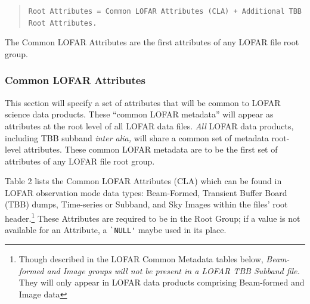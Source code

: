 \documentclass[a4paper,10pt,bibtotoc]{scrartcl}
\begin{document}
\begin{verse}
\verb|Root Attributes = Common LOFAR Attributes (CLA) + Additional TBB Root Attributes.|
\end{verse}

The Common LOFAR Attributes are the first attributes of any LOFAR file root group.

\subsubsection{Common LOFAR Attributes}
This section will specify a set of attributes that will be common to LOFAR science data products.  These ``common LOFAR metadata'' will appear as attributes at the root level of all LOFAR data files.  \textit{All} LOFAR data products, including TBB subband \textit{inter alia,} will share a common set of metadata root-level attributes.  These common LOFAR metadata are to be the first set of attributes of any LOFAR file root group.


Table 2 lists the Common LOFAR Attributes (CLA) which can be found in
LOFAR observation mode data types: Beam-Formed, Transient Buffer Board (TBB) dumps, Time-series or Subband, and Sky Images
within the files' root header.\footnote{Though described in the LOFAR Common Metadata tables below, \emph{Beam-formed and Image groups will not be present in a LOFAR TBB Subband file.}  They will only appear in LOFAR data products comprising Beam-formed and Image data}  These Attributes are required to be in the Root Group; if a value is not available for an Attribute, a \verb|`NULL'| maybe used in its place.
\end{document}
